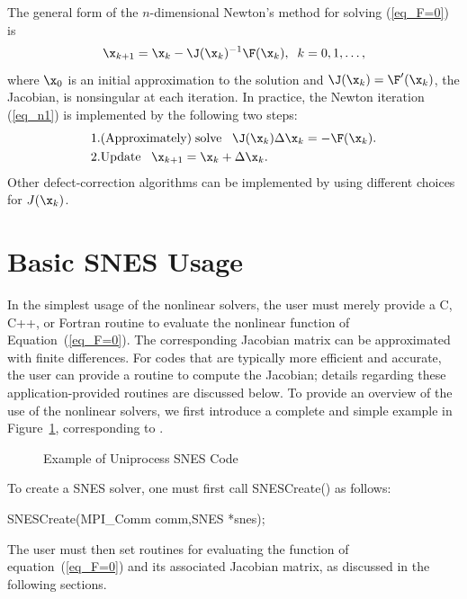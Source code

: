 The general form of the $n$-dimensional Newton's method for solving
(\ref{eq_F=0}) is
\begin{equation}
     \x_{k+1} = \x_k - \J(\x_k)^{-1} \F(\x_k), \;\; k=0,1, \ldots,
\label{eq_n1}
\end{equation}
where $ \x_0 $ is an initial approximation to the solution and
$ \J(\x_k) = \F'(\x_k) $, the Jacobian, is nonsingular at each iteration.
In practice, the Newton iteration (\ref{eq_n1}) is implemented by
the following two steps:
\begin{eqnarray}
  1. & {\rm (Approximately) \;solve\;\;\;} \J(\x_k) \Delta \x_k = -\F(\x_k).\\
  2. & {\rm Update\;\;\;} \x_{k+1} = \x_k + \Delta \x_k. \hspace{.225in}
\end{eqnarray}
Other defect-correction algorithms can be implemented by using different choices for $J(\x_k)$.

\section{Basic SNES Usage}
\label{sec_snesusage}

In the simplest usage of the nonlinear solvers, the user must merely
provide a C, C++, or Fortran routine to evaluate the nonlinear function
of Equation~(\ref{eq_F=0}).
The corresponding Jacobian  matrix
can be approximated with finite differences.
For codes that are typically more efficient and accurate, the
user can provide a routine to compute the Jacobian; details regarding these application-provided
routines are discussed below.
To provide an overview of the use of the nonlinear solvers,
we first introduce a complete and simple example in
Figure~\ref{fig_snesexample}, corresponding to
.

\begin{figure}[H]
{\small
{}
}
\caption{Example of Uniprocess SNES Code}
\label{fig_snesexample}
\end{figure}

To create a SNES solver, one must first call SNESCreate() as follows:
\begin{tabbing}
  SNESCreate(MPI\_Comm comm,SNES *snes);\\
\end{tabbing}
The user must then set
routines for evaluating the function of equation~(\ref{eq_F=0}) and its
associated Jacobian matrix, as discussed in the following sections.

